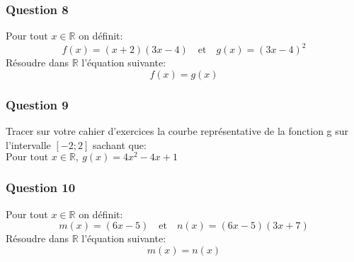 \documentclass[t,12pt]{beamer}
\newcommand{\R}{\mathbb{R}}
\begin{document}
\begin{frame}
	\frametitle{Question 8}
	Pour tout  $x\in\R$ on définit:$$f(x) = (x+2)(3x-4) \quad \text{et} \quad g(x) = (3x-4)^2$$
Résoudre dans $\R$ l'équation suivante: 
$$f(x) = g(x) $$
\end{frame}

\begin{frame}
	\frametitle{Question 9}
	Tracer sur votre cahier d'exercices la courbe représentative de la fonction g sur l'intervalle $[-2;2]$ sachant que:\\[0.25cm] 
	
	$\text{Pour tout } x \in\R, \ g(x)= 4x^2-4x +1$
\end{frame}

\begin{frame}
	\frametitle{Question 10}
	Pour tout  $x\in\R$ on définit:$$m(x) = (6x-5) \quad \text{et} \quad n(x) = (6x-5)(3x+7)$$
	Résoudre dans $\R$ l'équation suivante: 
	$$m(x) = n(x) $$
\end{frame}
\end{document}
